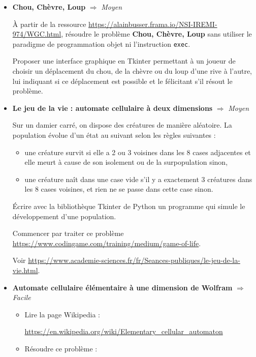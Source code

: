 \documentclass[a4paper, french, 12pt]{article}  %
\newcounter{act}
\begin{document}
\begin{itemize}

\item \textbf{Chou, Chèvre, Loup} $\Rightarrow$ \textit{Moyen}


\medskip


À partir de la ressource \url{https://alainbusser.frama.io/NSI-IREMI-974/WGC.html}, résoudre le problème \textbf{Chou, Chèvre, Loup}  sans utiliser le paradigme de programmation objet ni l'instruction \texttt{exec}.

Proposer une interface graphique en Tkinter permettant à un joueur de choisir un déplacement du  chou, de la chèvre ou du  loup d'une rive à l'autre, lui indiquant si ce déplacement est possible et le félicitant s'il résout le problème.


\bigskip

\item \textbf{Le jeu de la vie : automate cellulaire à deux dimensions} $\Rightarrow$ \textit{Moyen}

\medskip

Sur un damier carré, on dispose des créatures de manière aléatoire. La population évolue d'un état au suivant selon les règles suivantes :
\begin{itemize}
\item une créature survit si elle a 2 ou 3 voisines dans les 8 cases adjacentes et elle meurt à cause de son isolement ou de la surpopulation sinon,
\item une créature naît dans une case vide s'il y a exactement 3 créatures dans les 8 cases voisines, et rien ne se passe dans cette case sinon.
\end{itemize}
Écrire avec la bibliothèque Tkinter de Python un  programme qui simule le développement d'une population.

Commencer par traiter ce problème \url{https://www.codingame.com/training/medium/game-of-life}.

Voir \url{https://www.academie-sciences.fr/fr/Seances-publiques/le-jeu-de-la-vie.html}.

\bigskip

\item \textbf{Automate cellulaire élémentaire à une dimension de Wolfram} $\Rightarrow$ \textit{Facile}

\begin{itemize}
\item Lire la page Wikipedia : 

\url{https://en.wikipedia.org/wiki/Elementary_cellular_automaton}
\item Résoudre ce problème :


\end{itemize}
\end{itemize}
\end{document}
